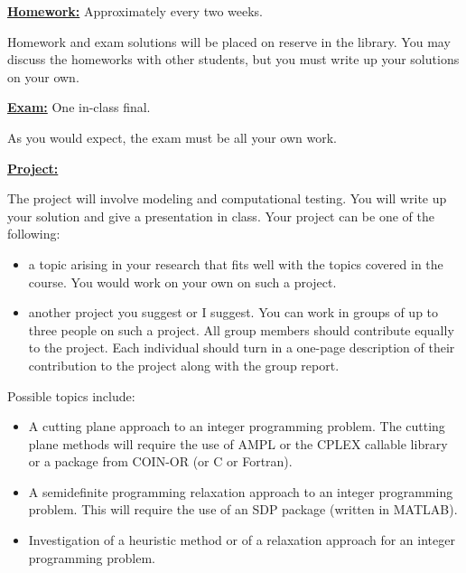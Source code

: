 \documentclass{article}
\begin{document}
\begin{flushleft}  \underline{\bf Homework:}  Approximately every two weeks.  \end{flushleft}
Homework and exam solutions will be placed on reserve in the
library.  You may discuss the homeworks with other students,
but you must write up your solutions on your own.


\begin{flushleft}  \underline{\bf Exam:}  One in-class final.  \end{flushleft}
As you would expect, the exam must be all your own work.

\begin{flushleft}  \underline{\bf Project:}  \end{flushleft}
The project will involve modeling and computational testing. You will write up your solution and give a presentation in class. Your project can be one of the following:
\begin{itemize}
\item
a topic arising in your research that fits well with the topics covered in the course. You would work on your own on such a project.
\item
another project you suggest or I suggest. You can work in groups of up to three people on such a project. All group members should contribute equally to the project. Each individual should turn in a one-page description of their contribution to the project along with the group report.
\end{itemize}
Possible topics include:
\begin{itemize}
\item
A cutting plane approach to an integer programming problem. The cutting plane methods will require the use of AMPL or the CPLEX callable library or a package from COIN-OR (or C or Fortran).
\item
A semidefinite programming relaxation approach to an integer programming problem. This will require the use of an SDP package (written in MATLAB).
\item
Investigation of a heuristic method or of a relaxation approach for an integer programming problem.
\end{itemize}

\end{document}
